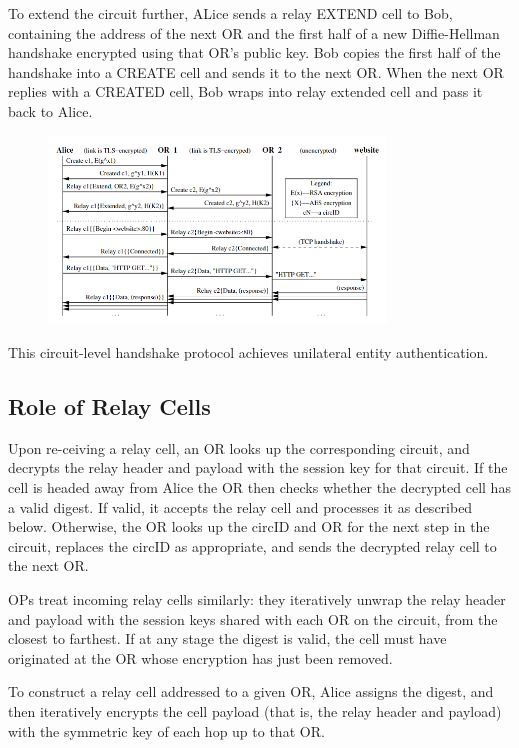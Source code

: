 \documentclass{main}
\begin{document}
To extend the circuit further, ALice sends a relay EXTEND cell to Bob, containing the address of the next OR and the first half of a new Diffie-Hellman handshake encrypted using that OR's public key.
Bob copies the first half of the handshake into a CREATE cell and sends it to the next OR.
When the next OR replies with a CREATED cell, Bob wraps into relay extended cell and pass it back to Alice.

\begin{figure}[h]
    \centering
    \includegraphics[width=0.8\textwidth]{Resources/images/tor_circuit.png}
\end{figure}

This circuit-level handshake protocol achieves unilateral entity authentication.

\subsection{Role of Relay Cells}
Upon re-ceiving a relay cell, an OR looks up the corresponding circuit,
and decrypts the relay header and payload with the session
key for that circuit. If the cell is headed away from Alice the
OR then checks whether the decrypted cell has a valid digest.
If valid, it accepts the relay cell and processes it as described
below. Otherwise, the OR looks up the circID and OR for the
next step in the circuit, replaces the circID as appropriate, and
sends the decrypted relay cell to the next OR.

OPs treat incoming relay cells similarly: they iteratively
unwrap the relay header and payload with the session keys
shared with each OR on the circuit, from the closest to farthest. If at any stage the digest is valid, the cell must have
originated at the OR whose encryption has just been removed.

To construct a relay cell addressed to a given OR, Alice assigns the digest, and then iteratively encrypts the cell payload
(that is, the relay header and payload) with the symmetric key
of each hop up to that OR.
\end{document}
